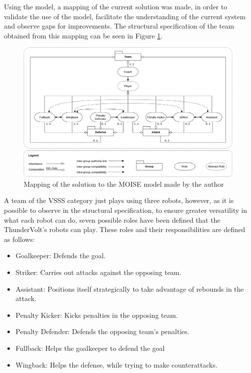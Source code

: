 Using the \MOISEp model, a mapping of the current solution was made, in order to validate the use of the model, facilitate the understanding of the current system and observe gaps for improvements. The structural specification of the team obtained from this mapping can be seen in Figure \ref{fig:moise_mapping}.

\begin{figure}[!ht]
    \centering
    \includegraphics[width=\linewidth]{chapters/target_system/images/ThunderVolt Moise-Structural Specification.png}
    \caption{Mapping of the solution to the MOISE model made by the author}
    \label{fig:moise_mapping}
\end{figure}

A team of the VSSS category just plays using three robots, however, as it is possible to observe in the structural specification, to ensure greater versatility in what each robot can do, seven possible roles have been defined that the ThunderVolt's robots can play. These roles and their responsibilities are defined as follows:

\begin{itemize}
    \item Goalkeeper: Defends the goal.
    \item Striker: Carries out attacks against the opposing team.
    \item Assistant: Positions itself strategically to take advantage of rebounds in the attack.
    \item Penalty Kicker: Kicks penalties in the opposing team.
    \item Penalty Defender: Defends the opposing team's penalties.
    \item Fullback: Helps the goalkeeper to defend the goal
    \item Wingback: Helps the defense, while trying to make counterattacks.
\end{itemize}

